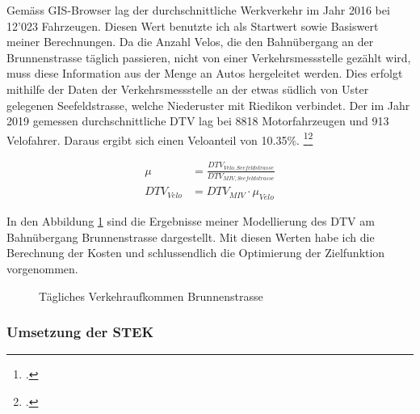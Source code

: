 Gemäss GIS-Browser lag der durchschnittliche Werkverkehr im Jahr 2016 bei 12'023 Fahrzeugen. Diesen Wert benutzte ich als Startwert sowie Basiswert meiner Berechnungen. Da die Anzahl Velos, die den Bahnübergang an der Brunnenstrasse täglich passieren, nicht von einer Verkehrsmessstelle gezählt wird, muss diese Information aus der Menge an Autos hergeleitet werden. Dies erfolgt mithilfe der Daten der Verkehrsmessstelle an der etwas südlich von Uster gelegenen Seefeldstrasse, welche Niederuster mit Riedikon verbindet. 
Der im Jahr 2019 gemessen durchschnittliche DTV lag bei 8818 Motorfahrzeugen und 913 Velofahrer. Daraus ergibt sich einen Veloanteil von 10.35\%. \footcite{MIVSeefeld}\footcite{VeloSeefeld}

\begin{align*}
\mu &= \frac{DTV_{Velo,Seefeldstrasse}}{DTV_{MIV,Seefeldstrasse}}   \\
DTV_{Velo} &= DTV_{MIV} \cdot \mu_{Velo} 
\end{align*}

In den Abbildung \ref{fig:DTV} sind die Ergebnisse meiner Modellierung des DTV am Bahnübergang Brunnenstrasse dargestellt. Mit diesen Werten habe ich die Berechnung der Kosten und schlussendlich die Optimierung der Zielfunktion vorgenommen.

\begin{figure}[h!]
  \centering
  \hfill
\caption[Verkehrsaufkommen]{Tägliches Verkehraufkommen Brunnenstrasse}
  \label{fig:DTV}
\end{figure}


\subsubsection*{Umsetzung der STEK}
\label{subsubsec:Umsetzung}


